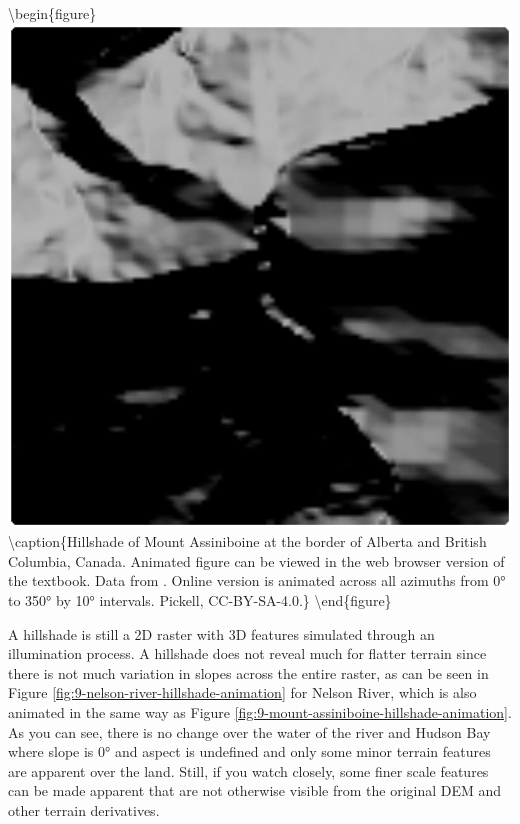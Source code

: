 \documentclass[
]{book}
\begin{document}
\textbackslash begin\{figure\}
\includegraphics[width=0.75\linewidth]{images/09-mount-assiniboine-hillshade-animation} \textbackslash caption\{Hillshade of Mount Assiniboine at the border of Alberta and British Columbia, Canada. Animated figure can be viewed in the web browser version of the textbook. Data from \citet{natural_resources_canada_canadian_2015}. Online version is animated across all azimuths from 0° to 350° by 10° intervals. Pickell, CC-BY-SA-4.0.\}\label{fig:9-mount-assiniboine-hillshade-animation}
\textbackslash end\{figure\}

A hillshade is still a 2D raster with 3D features simulated through an illumination process. A hillshade does not reveal much for flatter terrain since there is not much variation in slopes across the entire raster, as can be seen in Figure \ref{fig:9-nelson-river-hillshade-animation} for Nelson River, which is also animated in the same way as Figure \ref{fig:9-mount-assiniboine-hillshade-animation}. As you can see, there is no change over the water of the river and Hudson Bay where slope is 0° and aspect is undefined and only some minor terrain features are apparent over the land. Still, if you watch closely, some finer scale features can be made apparent that are not otherwise visible from the original DEM and other terrain derivatives.
\end{document}
